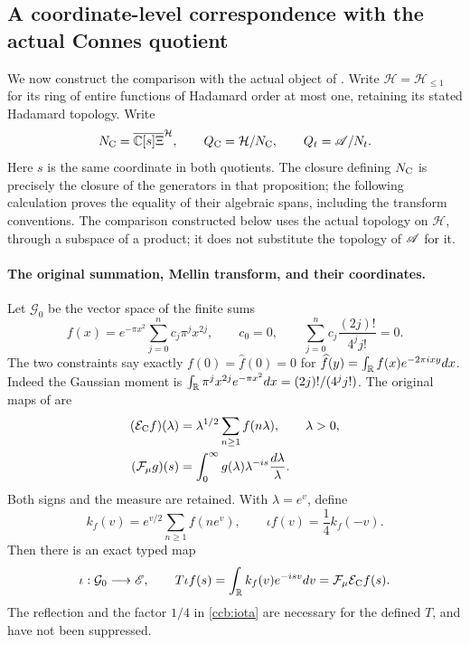 \subsection{A coordinate-level correspondence with the actual Connes quotient}
\label{ccb:bridge}
We now construct the comparison with the actual object of
\cite[Section 3.6, Proposition 3.6]{ccmProlate2024}.
Write $\mathcal H=\mathcal H_{\leq1}$ for its ring of entire functions
of Hadamard order at most one, retaining its stated Hadamard topology.
Write
\[
 N_{\rm C}=\overline{\mathbb C[s]\Xi}^{\mathcal H},\qquad
 Q_{\rm C}=\mathcal H/N_{\rm C},\qquad Q_t=\mathscr A/N_t.
\]
Here $s$ is the same coordinate in both quotients. The closure defining
$N_{\rm C}$ is precisely the closure of the generators in that proposition;
the following calculation proves the equality of their algebraic spans,
including the transform conventions. The comparison constructed below uses
the actual topology on $\mathcal H$, through a subspace of a product; it does
not substitute the topology of $\mathscr A$ for it.

\paragraph{The original summation, Mellin transform, and their coordinates.}
Let $\mathcal G_0$ be the vector space of the finite sums
\begin{equation}
 f(x)=e^{-\pi x^2}\sum_{j=0}^{n}c_j\pi^j x^{2j},\qquad
 c_0=0,\qquad
 \sum_{j=0}^{n}c_j\frac{(2j)!}{4^j j!}=0.
 \label{ccb:gaussian-space}
\end{equation}
The two constraints say exactly $f(0)=\widehat f(0)=0$ for
$\widehat f(y)=\int_\mathbb R f(x)e^{-2\pi ixy}dx$. Indeed the Gaussian
moment is $\int_\mathbb R\pi^j x^{2j}e^{-\pi x^2}dx=(2j)!/(4^j j!)$.
The original maps of \cite[equations (3.3), (3.4), and Section 3.6]{ccmProlate2024}
are
\begin{align}
 (\mathcal E_{\rm C}f)(\lambda)
   &=\lambda^{1/2}\sum_{n\geq1}f(n\lambda),\qquad \lambda>0,\notag\\
 (\mathcal F_\mu g)(s)
   &=\int_0^\infty g(\lambda)\lambda^{-is}\frac{d\lambda}{\lambda}.
 \label{ccb:original-transforms}
\end{align}
Both signs and the measure are retained. With $\lambda=e^v$, define
\begin{equation}
 k_f(v)=e^{v/2}\sum_{n\geq1}f(ne^v),\qquad
 \iota f(v)=\frac14 k_f(-v).
 \label{ccb:iota}
\end{equation}
Then there is an exact typed map
\begin{equation}
 \iota:\mathcal G_0\longrightarrow\mathscr E,\qquad
 T\iota f(s)=\int_\mathbb R k_f(v)e^{-isv}dv
             =\mathcal F_\mu\mathcal E_{\rm C}f(s).
 \label{ccb:fourier-bridge}
\end{equation}
The reflection and the factor $1/4$ in \eqref{ccb:iota} are necessary for
the defined $T$, and have not been suppressed.

